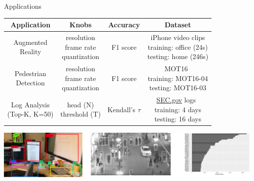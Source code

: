 \begin{frame}{Applications}
  \begin{table}
    \scriptsize
    \centering
    \begin{tabular}{c c c c}
      \toprule
      Application & Knobs & Accuracy & Dataset \\
      \midrule
      \specialcell{Augmented\\Reality}
                  & \specialcell{resolution \\ frame rate \\ quantization }
                  & \specialcell{F1 score\\\cite{Rijsbergen:1979:IR:539927}}
                  & \specialcell{iPhone video clips\\training: office (24s)\\testing: home (246s)} \\
      
      \midrule
      \specialcell{Pedestrian\\Detection}
                  & \specialcell{resolution \\ frame rate \\ quantization }
                  & F1 score
                          & \specialcell{MOT16~\cite{milan2016mot16}\\training: MOT16-04\\testing: MOT16-03} \\
      \midrule
      \specialcell{Log Analysis\\(Top-K, K=50)}
                  & \specialcell{head (N) \\ threshold (T) }
                  & \specialcell{Kendall's $\tau$\\\cite{abdi2007kendall}}
                  & \specialcell{\href{https://www.sec.gov}{SEC.gov} logs~\cite{edgarlog} \\ training: 4 days \\
      testing: 16 days} \\
      \bottomrule
    \end{tabular}
  \end{table}

  \includegraphics[width=\linewidth]{figures/apps.pdf}
\end{frame}

